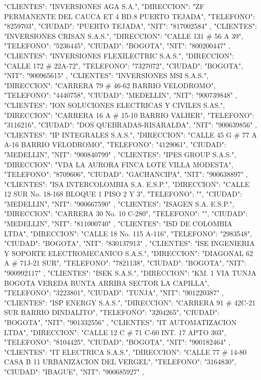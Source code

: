    {
   "CLIENTES": "INVERSIONES AGA S.A.",
   "DIRECCION": "ZF PERMANENTE DEL CAUCA ET 4 BD.8 PUERTO TEJADA",
   "TELEFONO": "8259703",
   "CIUDAD": "PUERTO TEJADA",
   "NIT": "817002584"
   },
   {
   "CLIENTES": "INVERSIONES CRISAN S.A.S.",
   "DIRECCION": "CALLE 131 # 56 A 39",
   "TELEFONO": "5236445",
   "CIUDAD": "BOGOTA",
   "NIT": "800200447"
   },
   {
   "CLIENTES": "INVERSIONES FLEXILECTRIC S.A.S.",
   "DIRECCION": "CALLE 172 # 22A-72",
   "TELEFONO": "7327072",
   "CIUDAD": "BOGOTA",
   "NIT": "900965615"
   },
   {
   "CLIENTES": "INVERSIONES MSI S.A.S.",
   "DIRECCION": "CARRERA 79 # 46-62 BARRIO VELODROMO",
   "TELEFONO": "4440758",
   "CIUDAD": "MEDELLIN",
   "NIT": "900739848"
   },
   {
   "CLIENTES": "ION SOLUCIONES ELECTRICAS Y CIVILES S.AS.",
   "DIRECCION": "CARRERA 16 A # 15-10 BARRIO VALHER",
   "TELEFONO": "3116216",
   "CIUDAD": "DOS QUEBRADAS-RISARALDA",
   "NIT": "900639856"
   },
   {
   "CLIENTES": "IP INTEGRALES S.A.S.",
   "DIRECCION": "CALLE 45 G # 77 A A-16 BARRIO VELODROMO",
   "TELEFONO": "4129061",
   "CIUDAD": "MEDELLIN",
   "NIT": "900840799"
   },
   {
   "CLIENTES": "IPES GROUP S.A.S.",
   "DIRECCION": "VDA LA AURORA FINCA LOTE VILLA MODESTA",
   "TELEFONO": "8709606",
   "CIUDAD": "GACHANCIPA",
   "NIT": "900638897"
   },
   {
   "CLIENTES": "ISA INTERCOLOMBIA S.A. E.S.P.",
   "DIRECCION": "CALLE 12 SUR No. 18-168 BLOQUE 1 PISO 2 Y 3",
   "TELEFONO": "",
   "CIUDAD": "MEDELLIN",
   "NIT": "900667590"
   },
   {
   "CLIENTES": "ISAGEN S.A. E.S.P.",
   "DIRECCION": "CARRERA 30 No. 10 C-280",
   "TELEFONO": "",
   "CIUDAD": "MEDELLIN",
   "NIT": "811000740"
   },
   {
   "CLIENTES": "ISD DE COLOMBIA LTDA",
   "DIRECCION": "CALLE 18 No. 115 A-116",
   "TELEFONO": "2983548",
   "CIUDAD": "BOGOTA",
   "NIT": "830137913"
   },
   {
   "CLIENTES": "ISE INGENIERIA Y SOPORTE ELECTROMECANICO S.A.S.",
   "DIRECCION": "DIAGONAL 62 A # 71J-21 SUR",
   "TELEFONO": "7821138",
   "CIUDAD": "BOGOTA",
   "NIT": "900992117"
   },
   {
   "CLIENTES": "ISEK S.A.S.",
   "DIRECCION": "KM. 1 VIA TUNJA BOGOTA VEREDA RUNTA ARRIBA SECTOR LA CAPILLA",
   "TELEFONO": "3223801",
   "CIUDAD": "TUNJA",
   "NIT": "901220387"
   },
   {
   "CLIENTES": "ISP ENERGY S.A.S.",
   "DIRECCION": "CARRERA 91 # 42C-21 SUR BARRIO DINDALITO",
   "TELEFONO": "3204265",
   "CIUDAD": "BOGOTA",
   "NIT": "901332556"
   },
   {
   "CLIENTES": "IT AUTOMATIZACION LTDA",
   "DIRECCION": "CALLE 12 C # 71 C-60 INT. 17 APTO 303",
   "TELEFONO": "8104425",
   "CIUDAD": "BOGOTA",
   "NIT": "900182464"
   },
   {
   "CLIENTES": "IT ELECTRICA S.A.S.",
   "DIRECCION": "CALLE 77 # 14-80 CASA B 11 URBANIZACION DEL VERGEL",
   "TELEFONO": "3164830",
   "CIUDAD": "IBAGUE",
   "NIT": "900685927"
   },

